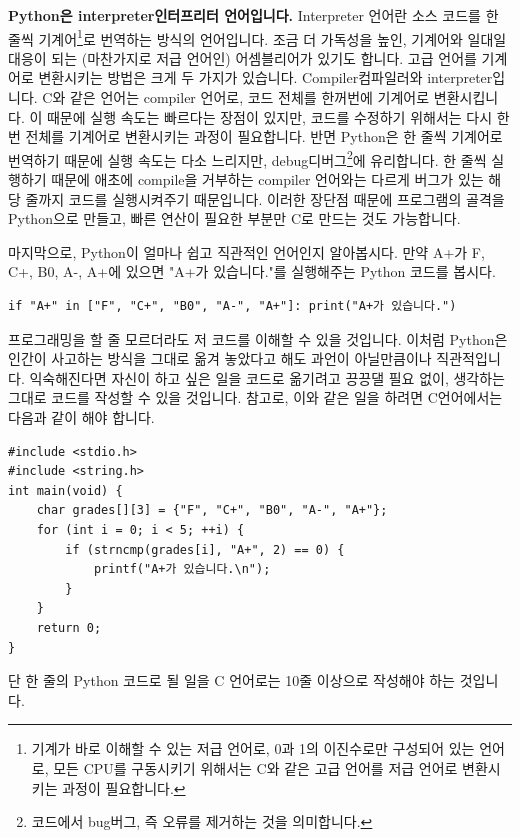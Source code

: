 \documentclass[a4paper,10pt]{memoir}
\begin{document}
\textbf{Python은 interpreter인터프리터 언어입니다.}
Interpreter 언어란 소스 코드를 한 줄씩 기계어\footnote{기계가 바로 이해할 수 있는 저급 언어로, 0과 1의 이진수로만 구성되어 있는 언어로, 모든 CPU를 구동시키기 위해서는 C와 같은 고급 언어를 저급 언어로 변환시키는 과정이 필요합니다.}로 번역하는 방식의 언어입니다.
조금 더 가독성을 높인, 기계어와 일대일 대응이 되는 (마찬가지로 저급 언어인) 어셈블리어가 있기도 합니다.
고급 언어를 기계어로 변환시키는 방법은 크게 두 가지가 있습니다.
Compiler컴파일러와 interpreter입니다.
C와 같은 언어는 compiler 언어로, 코드 전체를 한꺼번에 기계어로 변환시킵니다.
이 때문에 실행 속도는 빠르다는 장점이 있지만, 코드를 수정하기 위해서는 다시 한 번 전체를 기계어로 변환시키는 과정이 필요합니다.
반면 Python은 한 줄씩 기계어로 번역하기 때문에 실행 속도는 다소 느리지만, debug디버그\footnote{코드에서 bug버그, 즉 오류를 제거하는 것을 의미합니다.}에 유리합니다.
한 줄씩 실행하기 때문에 애초에 compile을 거부하는 compiler 언어와는 다르게 버그가 있는 해당 줄까지 코드를 실행시켜주기 때문입니다.
이러한 장단점 때문에 프로그램의 골격을 Python으로 만들고, 빠른 연산이 필요한 부분만 C로 만드는 것도 가능합니다.

마지막으로, Python이 얼마나 쉽고 직관적인 언어인지 알아봅시다.
만약 A+가 F, C+, B0, A-, A+에 있으면 "A+가 있습니다."를 실행해주는 Python 코드를 봅시다.
\begin{verbatim}
if "A+" in ["F", "C+", "B0", "A-", "A+"]: print("A+가 있습니다.")
\end{verbatim}
프로그래밍을 할 줄 모르더라도 저 코드를 이해할 수 있을 것입니다.
이처럼 Python은 인간이 사고하는 방식을 그대로 옮겨 놓았다고 해도 과언이 아닐만큼이나 직관적입니다.
익숙해진다면 자신이 하고 싶은 일을 코드로 옮기려고 끙끙댈 필요 없이, 생각하는 그대로 코드를 작성할 수 있을 것입니다.
참고로, 이와 같은 일을 하려면 C언어에서는 다음과 같이 해야 합니다.
\begin{verbatim}
#include <stdio.h>
#include <string.h>
int main(void) {
    char grades[][3] = {"F", "C+", "B0", "A-", "A+"};
    for (int i = 0; i < 5; ++i) {
        if (strncmp(grades[i], "A+", 2) == 0) {
            printf("A+가 있습니다.\n");
        }
    }
    return 0;
}
\end{verbatim}
단 한 줄의 Python 코드로 될 일을 C 언어로는 10줄 이상으로 작성해야 하는 것입니다.
\end{document}
